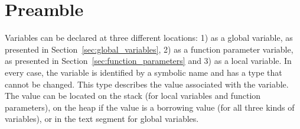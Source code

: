 \section{Preamble}

Variables can be declared at three different locations: 1) as a global variable,
as presented in Section~\ref{sec:global_variables}, 2) as a function parameter
variable, as presented in Section~\ref{sec:function_parameters} and 3) as a local
variable. In every case, the variable is identified by a symbolic name and has a
type that cannot be changed. This type describes the value associated with the
variable. The value can be located on the stack (for local variables and
function parameters), on the heap if the value is a borrowing value (for all
three kinds of variables), or in the text segment for global variables.
